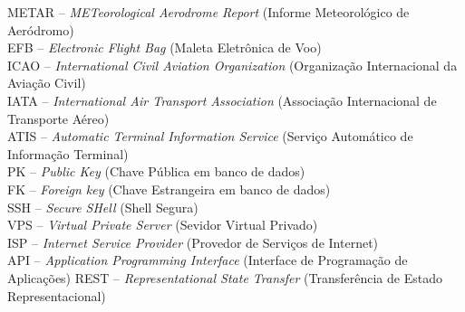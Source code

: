 \noindent \doublespacing
METAR -- \textit{METeorological Aerodrome Report} (Informe Meteorológico de Aeródromo)\\
EFB -- \textit{Electronic Flight Bag} (Maleta Eletrônica de Voo)\\
ICAO -- \textit{International Civil Aviation Organization} (Organização Internacional da Aviação Civil)\\
IATA -- \textit{International Air Transport Association} (Associação Internacional de Transporte Aéreo)\\
ATIS -- \textit{Automatic Terminal Information Service} (Serviço Automático de Informação Terminal)\\
PK -- \textit{Public Key} (Chave Pública em banco de dados)\\
FK -- \textit{Foreign key} (Chave Estrangeira em banco de dados)\\
SSH -- \textit{Secure SHell} (Shell Segura)\\
VPS -- \textit{Virtual Private Server} (Sevidor Virtual Privado)\\
ISP -- \textit{Internet Service Provider} (Provedor de Serviços de Internet)\\
API -- \textit{Application Programming Interface} (Interface de Programação de Aplicações)
REST -- \textit{Representational State Transfer} (Transferência de Estado Representacional)\\


